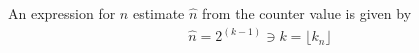 \documentclass[longpaper, english, final, times]{revdetua}
\begin{document}
		
	
	
	
		An expression for $n$ estimate $\widehat{n}$ from the counter value is given by
		\begin{align*}
			\widehat{n} = 2^{(k-1)} \ni k=\lfloor k_n\rfloor
		\end{align*}
	
\end{document}
